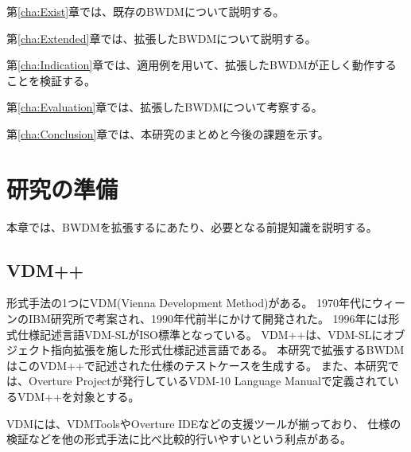 \documentclass[uplatex, report, a4j, 10pt]{jsbook}
\newcommand{\tool}{BWDM}
\begin{document}
第\ref{cha:Exist}章では、既存の\tool{}について説明する。

第\ref{cha:Extended}章では、拡張した\tool{}について説明する。

第\ref{cha:Indication}章では、適用例を用いて、拡張した\tool{}が正しく動作することを検証する。

第\ref{cha:Evaluation}章では、拡張した\tool{}について考察する。

第\ref{cha:Conclusion}章では、本研究のまとめと今後の課題を示す。



\chapter{研究の準備}\label{cha:Preparation}

本章では、\tool{}を拡張するにあたり、必要となる前提知識を説明する。

\section{VDM++}
形式手法の1つにVDM(Vienna Development Method)\cite{vdm}がある。
1970年代にウィーンのIBM研究所で考案され、1990年代前半にかけて開発された。
1996年には形式仕様記述言語VDM-SLがISO標準となっている\cite{iso96}。
VDM++は、VDM-SLにオブジェクト指向拡張を施した形式仕様記述言語である。
本研究で拡張するBWDMはこのVDM++で記述された仕様のテストケースを生成する。
また、本研究では、Overture Projectが発行しているVDM-10 Language Manualで定義されているVDM++を対象とする\cite{vdm_manual}。

VDMには、VDMTools\cite{vdmtools}やOverture IDE\cite{overture}などの支援ツールが揃っており、
仕様の検証などを他の形式手法に比べ比較的行いやすいという利点がある。
\end{document}

